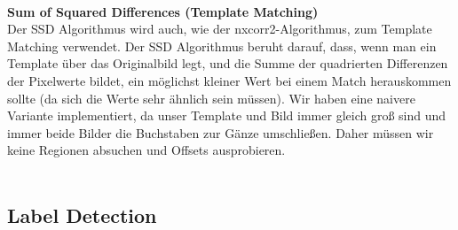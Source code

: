 \documentclass[paper=A4, deutsch]{scrartcl}
\begin{document}
\\
\textbf{Sum of Squared Differences (Template Matching)}\\
Der SSD Algorithmus wird auch, wie der nxcorr2-Algorithmus, zum Template Matching verwendet. Der SSD Algorithmus beruht darauf, dass, wenn man ein Template über das Originalbild legt, und die Summe der quadrierten Differenzen der Pixelwerte bildet, ein möglichst kleiner Wert bei einem Match herauskommen sollte (da sich die Werte sehr ähnlich sein müssen). Wir haben eine naivere Variante implementiert, da unser Template und Bild immer gleich groß sind und immer beide Bilder die Buchstaben zur Gänze umschließen. Daher müssen wir keine Regionen absuchen und Offsets ausprobieren.\\
\\

\subsection{Label Detection}
\end{document}
